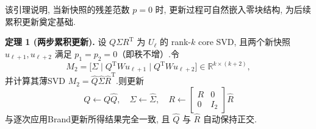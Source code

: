 该引理说明, 当新快照的残差范数 $p=0$ 时, 更新过程可自然嵌入零块结构, 为后续累积更新奠定基础.

\noindent\textbf{定理 1 (两步累积更新).} 
设 $Q\Sigma R^{\mathrm T}$ 为 $U_\ell$ 的 rank-$k$ core SVD, 且两个新快照 $u_{\ell+1},u_{\ell+2}$ 满足 $p_1=p_2=0$（即秩不增）.令
\begin{equation}
M_2 = \bigl[\Sigma \mid Q^{\mathrm T}W u_{\ell+1} \mid Q^{\mathrm T}W u_{\ell+2}\bigr]\in\mathbb{R}^{k\times(k+2)},
\end{equation}
并计算其薄SVD $M_2 = \widehat Q\widehat\Sigma\widehat R^{\mathrm T}$.则更新
\begin{equation}
Q \leftarrow Q\widehat Q,\quad \Sigma\leftarrow\widehat\Sigma,\quad R\leftarrow\begin{bmatrix}R & 0\\0 & I_2\end{bmatrix}\widehat R
\label{eq:agg_update2}
\end{equation}
与逐次应用Brand更新所得结果完全一致, 且 $\widehat Q$ 与 $\widehat R$ 自动保持正交.

